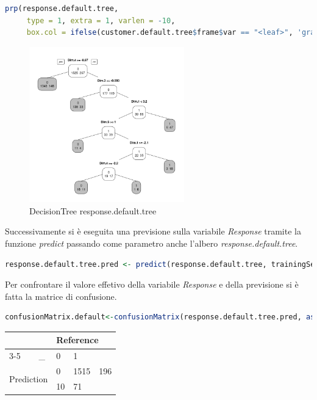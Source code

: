 \documentclass[letterpaper,11pt]{article}
\begin{document}
\begin{lstlisting}[language=R]
prp(response.default.tree, 
     type = 1, extra = 1, varlen = -10, 
     box.col = ifelse(customer.default.tree$frame$var == "<leaf>", 'gray', 'white'))
\end{lstlisting}

\begin{figure}[H]
    \centering
    \includegraphics[width=0.6\textwidth]{Img/D-TREE/D-TREE001.png}
    \caption{DecisionTree response.default.tree}
\end{figure}


Successivamente si è eseguita una previsione sulla variabile \textit{Response} tramite la funzione \textit{predict} passando come parametro anche l'albero \textit{response.default.tree}. 

\begin{lstlisting}[language=R]
response.default.tree.pred <- predict(response.default.tree, trainingSet_input,type = "class")
\end{lstlisting}

Per confrontare il valore effetivo della variabile \textit{Response} e della previsione si è fatta la matrice di confusione. 

\begin{lstlisting}[language=R]
confusionMatrix.default<-confusionMatrix(response.default.tree.pred, as.factor(trainingSet_input$Response), positive = "1")
\end{lstlisting}



\begin{table}[h!]
\centering
\begin{tabular}{|ll|lll|}
\hline
\multicolumn{2}{|l|}{\multirow{2}{*}{}} & \multicolumn{3}{l|}{Reference}                        \\ \cline{3-5} 
\multicolumn{2}{|l|}{}                  & \multicolumn{1}{c|}{\_} & \multicolumn{1}{l|}{0}  & 1  \\ \hline
\multicolumn{2}{|l|}{\multirow{2}{*}{Prediction}} & \multicolumn{1}{l|}{0} & \multicolumn{1}{l|}{1515} & 196 \\ \cline{3-5} 
\multicolumn{2}{|l|}{}                  & \multicolumn{1}{l|}{1} & \multicolumn{1}{l|}{10} & 71 \\ \hline
\end{tabular}
\end{table}
\end{document}
